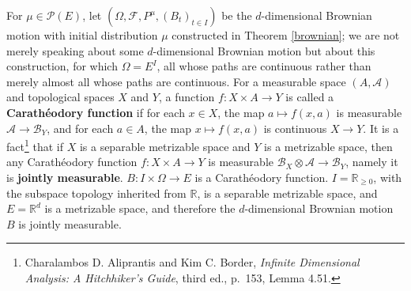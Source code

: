 \documentclass{article}
\theoremstyle{definition}
\theoremstyle{definition}
\begin{document}
For $\mu \in \mathscr{P}(E)$, let
 $(\Omega,\mathscr{F},P^\mu,(B_t)_{t \in I})$ be
the $d$-dimensional Brownian motion with initial distribution $\mu$ constructed in Theorem \ref{brownian}; we are not merely speaking about
some $d$-dimensional Brownian motion but about this construction, for which $\Omega=E^I$, all  whose paths are continuous rather than merely almost all whose paths are continuous. For a measurable space $(A,\mathscr{A})$ and topological spaces $X$ and $Y$, a function
$f:X \times A \to Y$ is called a \textbf{Carath\'eodory function} if for each $x \in X$, the map
$a \mapsto f(x,a)$ is measurable $\mathscr{A} \to \mathscr{B}_Y$, and for
each $a \in A$, the map $x \mapsto f(x,a)$ is continuous $X \to Y$. 
It is a fact\footnote{Charalambos D. Aliprantis
and Kim C. Border, {\em Infinite Dimensional Analysis: A Hitchhiker's Guide}, third ed., 
p.~153, Lemma 4.51.} that if $X$ is a separable metrizable space and $Y$ is a metrizable space, then
any Carath\'eodory function $f:X \times A \to Y$ is measurable
$\mathscr{B}_X \otimes \mathscr{A} \to \mathscr{B}_Y$, namely it is \textbf{jointly measurable}.
$B:I \times \Omega \to E$ is a Carath\'eodory function.
$I=\mathbb{R}_{\geq 0}$, with the subspace topology inherited from $\mathbb{R}$, is a separable metrizable space,
and $E=\mathbb{R}^d$ is a metrizable space, and therefore the $d$-dimensional Brownian motion $B$ is jointly measurable.
\end{document}

